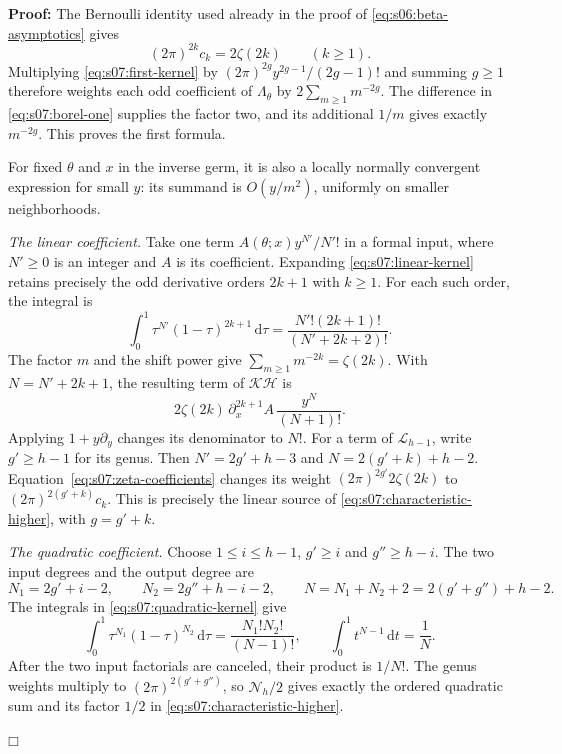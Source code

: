 \documentclass[a4paper,10pt]{article}
\numberwithin{equation}{section}
\newcommand{\dd}{\mathrm{d}}
\theoremstyle{paperplain}
\theoremstyle{paperremark}
\theoremstyle{paperplain}
\newenvironment{prf}{\noindent \textbf{Proof: }}{\hfill $\mdlgwhtsquare$\par\addvspace{0.5\baselineskip}}
\begin{document}
\begin{prf}
The Bernoulli identity used already in the proof of
\eqref{eq:s06:beta-asymptotics} gives
\begin{equation}\label{eq:s07:zeta-coefficients}
 (2\pi)^{2k}c_k=2\zeta(2k)\qquad(k\geq1).
\end{equation}
Multiplying \eqref{eq:s07:first-kernel} by
$(2\pi)^{2g}y^{2g-1}/(2g-1)!$ and summing $g\geq1$ therefore
weights each odd coefficient of $\Lambda_\theta$ by
$2\sum_{m\geq1}m^{-2g}$. The difference in
\eqref{eq:s07:borel-one} supplies the factor two, and its additional
$1/m$ gives exactly $m^{-2g}$. This proves the first formula.

For fixed $\theta$ and $x$ in the inverse germ, it is also a locally
normally convergent expression for small $y$: its summand is
$O(y/m^2)$, uniformly on smaller neighborhoods.

\smallskip\noindent
\emph{The linear coefficient.}
Take one term $A(\theta;x)y^{N'}/N'!$ in a formal input, where
$N'\geq0$ is an integer and $A$ is its coefficient. Expanding
\eqref{eq:s07:linear-kernel} retains precisely the odd derivative
orders $2k+1$ with $k\geq1$. For each such order, the integral is
\[
 \int_0^1\tau^{N'}(1-\tau)^{2k+1}\,\dd\tau
                   =\frac{N'!(2k+1)!}{(N'+2k+2)!}.
\]
The factor $m$ and the shift power give
$\sum_{m\geq1}m^{-2k}=\zeta(2k)$. With
$N=N'+2k+1$, the resulting term of $\mathcal K\mathcal H$ is
\[
 2\zeta(2k)\,\partial_x^{2k+1}A\,
                              \frac{y^N}{(N+1)!}.
\]
Applying $1+y\partial_y$ changes its denominator to $N!$.
For a term of $\mathcal L_{h-1}$, write
$g'\geq h-1$ for its genus. Then
$N'=2g'+h-3$ and $N=2(g'+k)+h-2$.
Equation~\eqref{eq:s07:zeta-coefficients} changes its weight
$(2\pi)^{2g'}2\zeta(2k)$ to
$(2\pi)^{2(g'+k)}c_k$. This is precisely the linear source of
\eqref{eq:s07:characteristic-higher}, with $g=g'+k$.

\smallskip\noindent
\emph{The quadratic coefficient.}
Choose $1\leq i\leq h-1$, $g'\geq i$ and $g''\geq h-i$.
The two input degrees and the output degree are
\[
 N_1=2g'+i-2,\qquad N_2=2g''+h-i-2,\qquad
 N=N_1+N_2+2=2(g'+g'')+h-2.
\]
The integrals in \eqref{eq:s07:quadratic-kernel} give
\[
 \int_0^1\tau^{N_1}(1-\tau)^{N_2}\,\dd\tau
       =\frac{N_1!N_2!}{(N-1)!},\qquad
 \int_0^1t^{N-1}\,\dd t=\frac1N.
\]
After the two input factorials are canceled, their product is
$1/N!$. The genus weights multiply to
$(2\pi)^{2(g'+g'')}$, so $\mathcal N_h/2$ gives exactly the
ordered quadratic sum and its factor $1/2$ in
\eqref{eq:s07:characteristic-higher}.


\end{prf}
\end{document}
